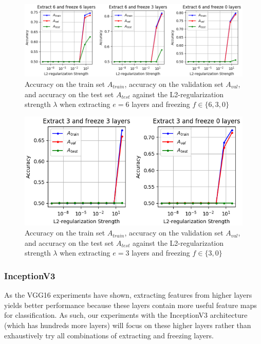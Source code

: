 \begin{figure}[ht]
    \centering
    \includegraphics[width=1.0\textwidth]{figs/results_1_6.png}
    \caption{Accuracy on the train set $A_{train}$, accuracy on the validation set $A_{val}$, and accuracy on the test set $A_{test}$ against the L2-regularization strength $\lambda$ when extracting $e = 6$ layers and freezing $f \in \{6, 3, 0\}$}
    \label{fig:results_1_6}
\end{figure}

\begin{figure}[ht]
    \centering
    \includegraphics[width=1.0\textwidth]{figs/results_1_3.png}
    \caption{Accuracy on the train set $A_{train}$, accuracy on the validation set $A_{val}$, and accuracy on the test set $A_{test}$ against the L2-regularization strength $\lambda$ when extracting $e = 3$ layers and freezing $f \in \{3, 0\}$}
    \label{fig:results_1_3}
\end{figure}


\subsubsection{InceptionV3}

As the VGG16 experiments have shown, extracting features from higher layers yields better performance because these layers contain more useful feature maps for classification. As such, our experiments with the InceptionV3 architecture (which has hundreds more layers) will focus on these higher layers rather than exhaustively try all combinations of extracting and freezing layers.


